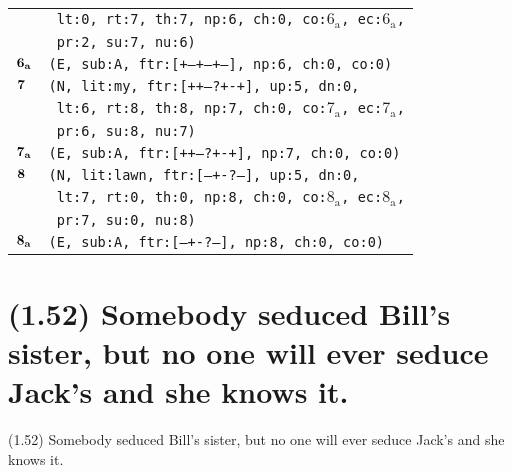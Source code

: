 \documentclass{article}
\begin{document}
\begin{minipage}{\textwidth}
{\begin{tabular}{|r|l|}
    & \texttt{\texttt{~lt:0,~rt:7,~th:7,~np:6,~ch:0,~co:${\textrm{6}_{\textrm{a}}}$,~ec:${\textrm{6}_{\textrm{a}}}$,}} \\
    & \texttt{\texttt{~pr:2,~su:7,~nu:6)}} \\
    ${\textbf{\textrm{6}}_{\textbf{\textrm{a}}}}$ & \texttt{\texttt{(E,~sub:A,~ftr:[+--+--+--],~np:6,~ch:0,~co:0)}} \\
    ${\textbf{\textrm{7}}_{\phantom{z}}}$ & \texttt{\texttt{(N,~lit:my,~ftr:[++---?+-+],~up:5,~dn:0,}} \\
    & \texttt{\texttt{~lt:6,~rt:8,~th:8,~np:7,~ch:0,~co:${\textrm{7}_{\textrm{a}}}$,~ec:${\textrm{7}_{\textrm{a}}}$,}} \\
    & \texttt{\texttt{~pr:6,~su:8,~nu:7)}} \\
    ${\textbf{\textrm{7}}_{\textbf{\textrm{a}}}}$ & \texttt{\texttt{(E,~sub:A,~ftr:[++---?+-+],~np:7,~ch:0,~co:0)}} \\
    ${\textbf{\textrm{8}}_{\phantom{z}}}$ & \texttt{\texttt{(N,~lit:lawn,~ftr:[---+-?---],~up:5,~dn:0,}} \\
    & \texttt{\texttt{~lt:7,~rt:0,~th:0,~np:8,~ch:0,~co:${\textrm{8}_{\textrm{a}}}$,~ec:${\textrm{8}_{\textrm{a}}}$,}} \\
    & \texttt{\texttt{~pr:7,~su:0,~nu:8)}} \\
    ${\textbf{\textrm{8}}_{\textbf{\textrm{a}}}}$ & \texttt{\texttt{(E,~sub:A,~ftr:[---+-?---],~np:8,~ch:0,~co:0)}} \\
    \hline
  \end{tabular}
  }
\end{minipage}
\bigbreak

\clearpage

%
%

\section*{(1.52) Somebody seduced Bill's sister, but no one will ever seduce Jack’s and she knows it.}

\bigbreak
\begin{enumerate*}
\item[(1.52)] Somebody seduced Bill's sister, but no one will ever seduce Jack’s and she knows it.
\end{enumerate*}
\bigbreak
\end{document}

